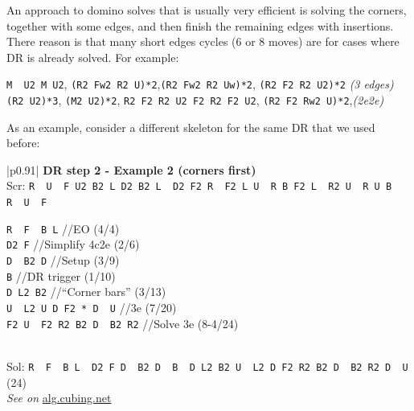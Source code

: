 \documentclass[11pt,a4paper]{book}
\newcommand{\p}{\textquotesingle}
\newcommand{\m}{\texttt}
\newcommand{\ps}{\p\,\,}
\newcommand{\comment}[1]{{\color{gray}\quad//#1}}
\begin{document}
An approach to domino solves that is usually very efficient is solving the corners, together with some edges, and then finish the remaining edges with insertions. There reason is that many short edges cycles ($6$ or $8$ moves) are for cases where DR is already solved. For example:
\begin{center}
\m{M\ps U2 M U2}, \quad\m{(R2 Fw2 R2 U)*2},\quad\m{(R2 Fw2 R2 Uw)*2}, \quad \m{(R2 F2 R2 U2)*2} \qquad \emph{(3 edges)}\\
\m{(R2 U2)*3}, \quad \m{(M2 U2)*2}, \quad \m{R2 F2 R2 U2 F2 R2 F2 U2}, \quad \m{(R2 F2 Rw2 U)*2},\qquad \emph{(2e2e)}
\end{center}

As an example, consider a different skeleton for the same DR that we used before:

\bigskip
\begin{tabular}{|p{}|}
\hline
\textbf{DR step 2 - Example 2 (corners first)}\\
\hline
Scr: \m{R\ps U\ps F  U2 B2 L  D2 B2 L\ps D2 F2 R\ps F2 L  U\ps R B  F2 L\ps R2 U\ps R  U  B R\ps U\ps F}\\
\hline
\begin{minipage}[l]{0.650\textwidth}
\m{R\ps F\ps B L\p} \comment{EO (4/4)}\\
\m{D2 F} \comment{Simplify 4c2e (2/6)}\\
\m{D\ps B2 D\p} \comment{Setup (3/9)}\\
\m{B\p} \comment{DR trigger (1/10)}\\
\m{D L2 B2} \comment{``Corner bars'' (3/13)}\\
\m{U\ps L2 U D F2 * D\ps U} \comment{3e (7/20)}\\
\m{F2 U\ps F2 R2 B2 D\ps B2 R2} \comment{Solve 3e (8-4/24)}
\end{minipage}
\begin{minipage}[c]{0.25\textwidth}

\end{minipage}\\
\hline
Sol: \m{R\ps F\ps B L\ps D2 F D\ps B2 D\ps B\ps D L2 B2 U\ps L2 D F2 R2 B2 D\ps B2 R2 D\ps U} (24)\\
\hline
\emph{See on }\href{https://alg.cubing.net/?alg=R-_F-_B_L-_\%2F\%2FEO_(4\%2F4)\%0AD2_F_\%2F\%2FSimplify_(2\%2F6)\%0AD-_B2_D-_B-_\%2F\%2FDR_(4\%2F10)\%0AD_L2_B2_\%2F\%2FCorner_bars_(3\%2F13)\%0AU-_L2_U_D_F2_D-_U_\%2F\%2F3e_(7\%2F20)&setup=R-_U-_F__U2_B2_L__D2_B2_L-_D2_F2_R-_F2_L__U-_R__B__F2_L-_R2_U-_R__U__B__R-_U-_F}{alg.cubing.net}\\
\hline
\end{tabular}
\bigskip
\end{document}
